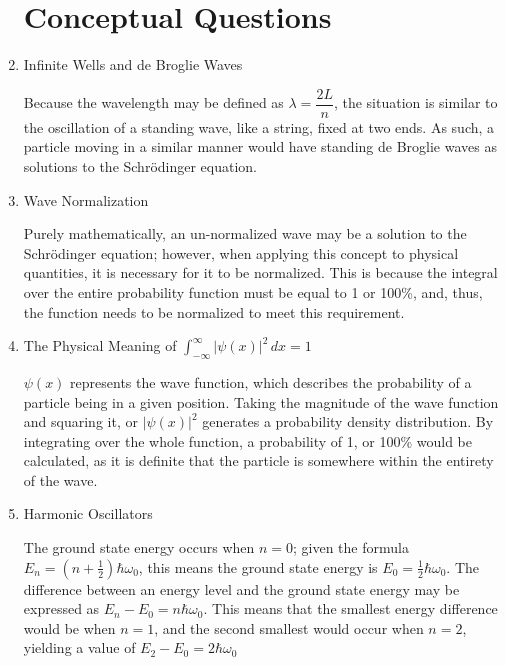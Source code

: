 \begin{enumerate}

    \section{Conceptual Questions}

  \item Infinite Wells and de Broglie Waves

    Because the wavelength may be defined as $\lambda=\dfrac{2L}{n}$, the situation is similar to the oscillation of a standing wave, like a string, fixed at two ends. As such, a particle moving in a similar manner would have standing de Broglie waves as solutions to the Schr\"odinger equation.

  \item Wave Normalization

    Purely mathematically, an un-normalized wave may be a solution to the Schr\"odinger equation; however, when applying this concept to physical quantities, it is necessary for it to be normalized. This is because the integral over the entire probability function must be equal to 1 or 100\%, and, thus, the function needs to be normalized to meet this requirement.

  \item The Physical Meaning of $\displaystyle \int_{-\infty}^{\infty} |\psi(x)|^2\,dx=1$

    $\psi(x)$ represents the wave function, which describes the probability of a particle being in a given position. Taking the magnitude of the wave function and squaring it, or $|\psi(x)|^2$ generates a probability density distribution. By integrating over the whole function, a probability of 1, or 100\% would be calculated, as it is definite that the particle is somewhere within the entirety of the wave.

  \item Harmonic Oscillators

    The ground state energy occurs when $n=0$; given the formula $E_n=\left(n+\frac{1}{2}\right)\hbar\omega_0$, this means the ground state energy is $E_0=\frac{1}{2}\hbar\omega_0$. The difference between an energy level and the ground state energy may be expressed as $E_n-E_0=n\hbar\omega_0$. This means that the smallest energy difference would be when $n=1$, and the second smallest would occur when $n=2$, yielding a value of $E_2-E_0=2\hbar\omega_0$

\end{enumerate}

